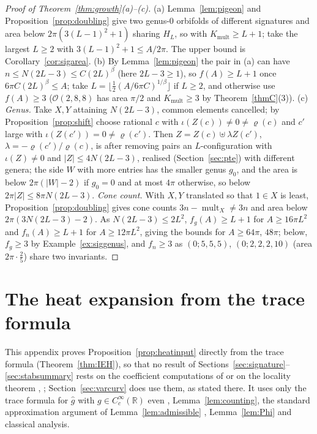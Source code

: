 \documentclass[pdflatex,sn-mathphys-num]{sn-jnl}
\theoremstyle{thmstyleone}%
\theoremstyle{thmstylethree}%
\newcommand{\Orb}{\mathcal{O}}
\newcommand{\Kmult}{K_{\mathrm{mult}}}
\newcommand{\R}{\mathbb{R}}
\newcommand{\mult}{\operatorname{mult}}
\begin{document}
\begin{appendices}
\begin{proof}[Proof of Theorem~\ref{thm:growth}(a)--(c)]
(a) Lemma~\ref{lem:pigeon} and Proposition~\ref{prop:doubling} give two genus-$0$ orbifolds of different signatures and area below $2\pi(3(L-1)^2+1)$ sharing $H_L$, so with $\Kmult\ge L+1$; take the largest $L\ge2$ with $3(L-1)^2+1\le A/2\pi$. The upper bound is Corollary~\ref{cor:sigarea}.
(b) By Lemma~\ref{lem:pigeon} the pair in (a) can have $n\le N(2L-3)\le C(2L)^\beta$ (here $2L-3\ge1$), so $f(A)\ge L+1$ once $6\pi C(2L)^\beta\le A$; take $L=\lfloor\frac12(A/6\pi C)^{1/\beta}\rfloor$ if $L\ge2$, and otherwise use $f(A)\ge3$ ($\Orb(2,8,8)$ has area $\pi/2$ and $\Kmult\ge3$ by Theorem~\ref{thmC}(3)).
(c) \emph{Genus.} Take $X,Y$ attaining $N(2L-3)$, common elements cancelled; by Proposition~\ref{prop:shift} choose rational $c$ with $\iota(Z(c))\ne0\ne\varrho(c)$ and $c'$ large with $\iota(Z(c'))=0\ne\varrho(c')$. Then $Z=Z(c)\uplus\lambda Z(c')$, $\lambda=-\varrho(c')/\varrho(c)$, is after removing pairs an $L$-configuration with $\iota(Z)\ne0$ and $|Z|\le4N(2L-3)$, realised (Section~\ref{sec:pte}) with different genera; the side $W$ with more entries has the smaller genus $g_0$, and the area is below $2\pi(|W|-2)$ if $g_0=0$ and at most $4\pi$ otherwise, so below $2\pi|Z|\le8\pi N(2L-3)$. \emph{Cone count.} With $X,Y$ translated so that $1\in X$ is least, Proposition~\ref{prop:doubling} gives cone counts $3n-\mult_X\ne3n$ and area below $2\pi(3N(2L-3)-2)$. As $N(2L-3)\le2L^2$, $f_g(A)\ge L+1$ for $A\ge16\pi L^2$ and $f_n(A)\ge L+1$ for $A\ge12\pi L^2$, giving the bounds for $A\ge64\pi$, $48\pi$; below, $f_g\ge3$ by Example~\ref{ex:siggenus}, and $f_n\ge3$ as $(0;5,5,5)$, $(0;2,2,2,10)$ (area $2\pi\cdot\frac25$) share two invariants.
\end{proof}

\section{The heat expansion from the trace formula}\label{app:derivation}

This appendix proves Proposition~\ref{prop:heatinput} directly from the trace formula (Theorem~\ref{thm:IEH}), so that no result of Sections~\ref{sec:signature}--\ref{sec:stabsummary} rests on the coefficient computations of \cite{dggw2008,ucar2017} or on the locality theorem \cite{donnelly1979}, \cite[Thm~4.8]{dggw2008}; Section~\ref{sec:varcurv} does use them, as stated there. It uses only the trace formula for $\hat g$ with $g\in C_c^\infty(\R)$ even \cite[eq.~(1)]{drydenstrohmaier2009}, Lemma~\ref{lem:counting}, the standard approximation argument of Lemma~\ref{lem:admissible} \cite{hejhal1976,iwaniec2002}, Lemma~\ref{lem:Phi} and classical analysis.



\end{appendices}
\end{document}
